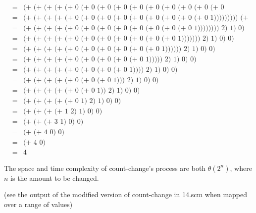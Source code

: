 \documentclass{minimal}
\begin{document}
{\begin{landscape}
\begin{eqnarray*}
  \\ &=& \text{(+ (+ (+ (+ (+ 0 (+ 0 (+ 0 (+ 0 (+ 0 (+ 0 (+ 0 (+ 0 (+ 0 (+ 0 1)))))))))) (+ (+ 0 1) 1)) 1) 0) 0)}
  \\ &=& \text{(+ (+ (+ (+ (+ 0 (+ 0 (+ 0 (+ 0 (+ 0 (+ 0 (+ 0 (+ 0 (+ 0 1))))))))) (+ 1 1)) 1) 0) 0)}
  \\ &=& \text{(+ (+ (+ (+ (+ 0 (+ 0 (+ 0 (+ 0 (+ 0 (+ 0 (+ 0 (+ 0 1)))))))) 2) 1) 0) 0)}
  \\ &=& \text{(+ (+ (+ (+ (+ 0 (+ 0 (+ 0 (+ 0 (+ 0 (+ 0 (+ 0 1))))))) 2) 1) 0) 0)}
  \\ &=& \text{(+ (+ (+ (+ (+ 0 (+ 0 (+ 0 (+ 0 (+ 0 (+ 0 1)))))) 2) 1) 0) 0)}
  \\ &=& \text{(+ (+ (+ (+ (+ 0 (+ 0 (+ 0 (+ 0 (+ 0 1))))) 2) 1) 0) 0)}
  \\ &=& \text{(+ (+ (+ (+ (+ 0 (+ 0 (+ 0 (+ 0 1)))) 2) 1) 0) 0)}
  \\ &=& \text{(+ (+ (+ (+ (+ 0 (+ 0 (+ 0 1))) 2) 1) 0) 0)}
  \\ &=& \text{(+ (+ (+ (+ (+ 0 (+ 0 1)) 2) 1) 0) 0)}
  \\ &=& \text{(+ (+ (+ (+ (+ 0 1) 2) 1) 0) 0)}
  \\ &=& \text{(+ (+ (+ (+ 1 2) 1) 0) 0)}
  \\ &=& \text{(+ (+ (+ 3 1) 0) 0)}
  \\ &=& \text{(+ (+ 4 0) 0)}

  \\ &=& \text{(+ 4 0)}
  \\ &=& 4
\end{eqnarray*}

The space and time complexity of count-change's process are both $\theta(2^n)$, where $n$ is the amount to be changed.

(see the output of the modified version of count-change in 14.scm when mapped over a range of values)
\end{landscape}}
\end{document}
